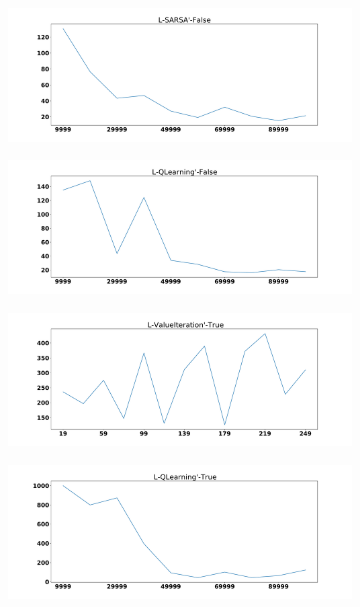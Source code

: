 \documentclass{amsart}
\begin{document}
    \begin{figure}
    \centering
    \begin{subfigure}[t]{0.3\textwidth}
    \centering
    \includegraphics[width=\textwidth]{Ltrack_2_learning_rate.pdf}
    \end{subfigure}
    \begin{subfigure}[t]{0.3\textwidth}
    \centering
    \includegraphics[width=\textwidth]{Ltrack_3_learning_rate.pdf}
    \end{subfigure}
    \begin{subfigure}[t]{0.3\textwidth}
    \centering
    \includegraphics[width=\textwidth]{Ltrack_6_learning_rate.pdf}
    \end{subfigure}
    \begin{subfigure}[t]{0.3\textwidth}
    \centering
    \includegraphics[width=\textwidth]{Ltrack_5_learning_rate.pdf}

\end{subfigure}
\end{figure}
\end{document}

